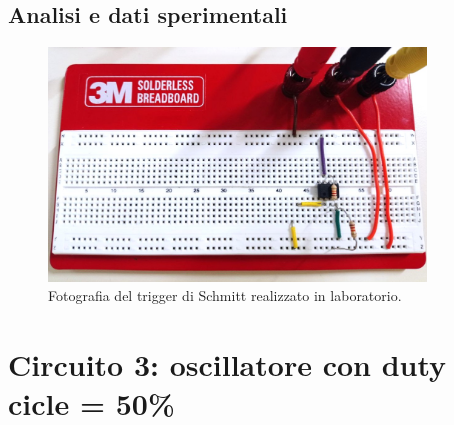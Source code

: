 \documentclass{report}
\begin{document}
\subsection{Analisi e dati sperimentali}
\begin{figure}[h]
	\centering
	\includegraphics[height=6.2cm]{immagini/circuito2}
	\caption{Fotografia del trigger di Schmitt realizzato in laboratorio.}
	\label{figura:circuito2}
\end{figure}

\section{Circuito 3: oscillatore con duty cicle = 50\%}
\end{document}
